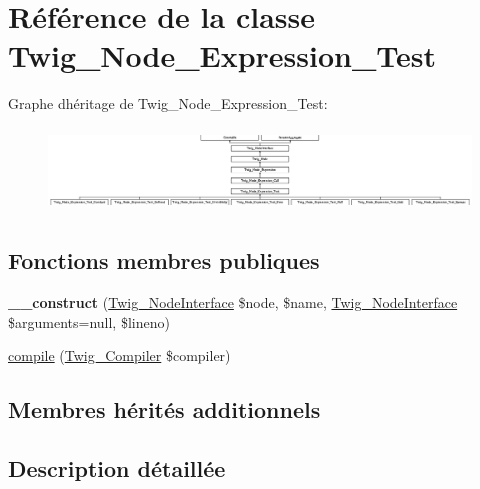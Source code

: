 \hypertarget{class_twig___node___expression___test}{}\section{Référence de la classe Twig\+\_\+\+Node\+\_\+\+Expression\+\_\+\+Test}
\label{class_twig___node___expression___test}
Graphe d\textquotesingle{}héritage de Twig\+\_\+\+Node\+\_\+\+Expression\+\_\+\+Test\+:\begin{figure}[H]
\begin{center}
\leavevmode
\includegraphics[height=2.231076cm]{class_twig___node___expression___test}
\end{center}
\end{figure}
\subsection*{Fonctions membres publiques}
\begin{DoxyCompactItemize}
\item 
{\bfseries \+\_\+\+\_\+construct} (\hyperlink{interface_twig___node_interface}{Twig\+\_\+\+Node\+Interface} \$node, \$name, \hyperlink{interface_twig___node_interface}{Twig\+\_\+\+Node\+Interface} \$arguments=null, \$lineno)\hypertarget{class_twig___node___expression___test_a341762e0b4ca6e93e6bfd4cc2f7a0b0b}{}\label{class_twig___node___expression___test_a341762e0b4ca6e93e6bfd4cc2f7a0b0b}

\item 
\hyperlink{class_twig___node___expression___test_a4e0faa87c3fae583620b84d3607085da}{compile} (\hyperlink{class_twig___compiler}{Twig\+\_\+\+Compiler} \$compiler)
\end{DoxyCompactItemize}
\subsection*{Membres hérités additionnels}


\subsection{Description détaillée}


